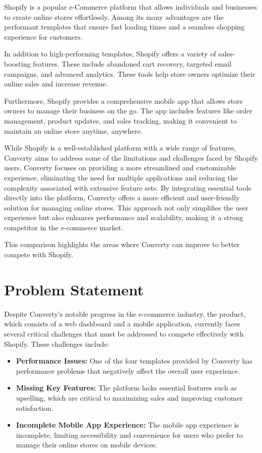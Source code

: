 Shopify is a popular e-Commerce platform that allows individuals and businesses to create online stores effortlessly. Among its many advantages are the performant templates that ensure fast loading times and a seamless shopping experience for customers.

In addition to high-performing templates, Shopify offers a variety of sales-boosting features. These include abandoned cart recovery, targeted email campaigns, and advanced analytics. These tools help store owners optimize their online sales and increase revenue.

Furthermore, Shopify provides a comprehensive mobile app that allows store owners to manage their business on the go. The app includes features like order management, product updates, and sales tracking, making it convenient to maintain an online store anytime, anywhere.

While Shopify is a well-established platform with a wide range of features, Converty aims to address some of the limitations and challenges faced by Shopify users. Converty focuses on providing a more streamlined and customizable experience, eliminating the need for multiple applications and reducing the complexity associated with extensive feature sets. By integrating essential tools directly into the platform, Converty offers a more efficient and user-friendly solution for managing online stores. This approach not only simplifies the user experience but also enhances performance and scalability, making it a strong competitor in the e-commerce market.

This comparison highlights the areas where Converty can improve to better compete with Shopify.

\section{Problem Statement} 
Despite Converty's notable progress in the e-commerce industry, the product, which consists of a web dashboard and a mobile application, currently faces several critical challenges that must be addressed to compete effectively with Shopify. These challenges include:

\begin{itemize} 
    \item \textbf{Performance Issues:} One of the four templates provided by Converty has performance problems that negatively affect the overall user experience. 
    \item \textbf{Missing Key Features:} The platform lacks essential features such as upselling, which are critical to maximizing sales and improving customer satisfaction. 
    \item \textbf{Incomplete Mobile App Experience:} The mobile app experience is incomplete, limiting accessibility and convenience for users who prefer to manage their online stores on mobile devices. 
\end{itemize} 

